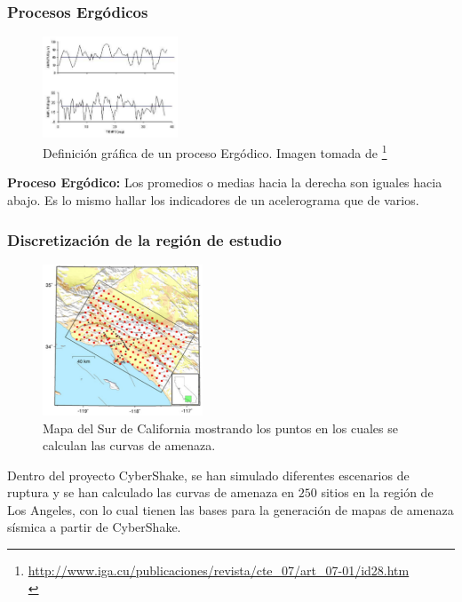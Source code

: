 %
%
\begin{frame}%
\frametitle{Procesos Ergódicos}
%
\justifying
%
\begin{figure}[h]
	\centering
	\includegraphics[height=3cm]{img/Ergodico.pdf}
	\caption{Definición gráfica de un proceso Ergódico. Imagen tomada de \footnote{\tiny \url{http://www.iga.cu/publicaciones/revista/cte_07/art_07-01/id28.htm}\\}}
	\vspace{-.5 cm}
\end{figure}
%
\textbf{Proceso Ergódico:} Los promedios o medias hacia la derecha son iguales hacia abajo. Es lo mismo hallar los indicadores de un acelerograma que de varios.\\
%
\end{frame}
%
%
\begin{frame}[allowframebreaks]
\frametitle{Discretización de la región de estudio}
%
\justifying
\begin{figure}[h]
	\centering
	\includegraphics[height=4.5cm]{img/Discretizacion.pdf}
	\caption{Mapa del Sur de California mostrando los puntos en los cuales se calculan las curvas de amenaza. \cite[figura 1, página 3]{gravesetal}}
	\vspace{-.5 cm}
\end{figure}
%
Dentro del proyecto CyberShake, se han simulado diferentes escenarios de ruptura y se han calculado las curvas de amenaza en $250$ sitios en la región de Los Angeles, con lo cual tienen las bases para la generación de mapas de amenaza sísmica a partir de CyberShake.\\
%
%
\end{frame}
